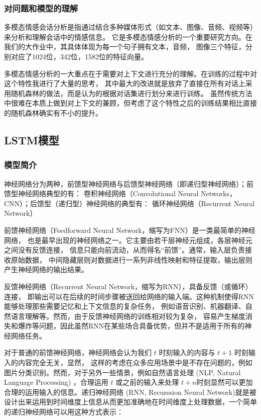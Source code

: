 \documentclass[11pt]{article}
\begin{document}
            \subsubsection{对问题和模型的理解}
            多模态情感会话分析是指通过结合多种媒体形式（如文本、图像、音频、视频等）来分析和理解会话中的情感信息。
            它是多模态情感分析的一个重要研究方向。在我们的大作业中，其具体体现为每一个句子拥有文本，音频，
            图像三个特征，分别对应了1024位，342位，1582位的特征向量。

            多模态情感分析的一大重点在于需要对上下文进行充分的理解。在训练的过程中对这个特性我进行了大量的思考，
            其中最大的改进就是放弃了直接在所有对话上采用随机森林的做法，而是认为的根据对话集进行划分来进行训练。
            虽然传统方法中很难在本质上做到对上下文的兼顾，但考虑了这个特性之后的训练结果相比直接的随机森林确实有不小的提升。

        \subsection{LSTM模型}
            \subsubsection{模型简介}
            神经网络分为两种，前馈型神经网络与后馈型神经网络（即递归型神经网络）；前馈型神经网络典型的有：
            卷积神经网络（Convolutional Neural Networks，CNN）；后馈型（递归型）神经网络的典型有：
            循环神经网络（Recurrent Neural Network）
            
            前馈神经网络（Feedforward Neural Network，缩写为FNN）是一类最简单的神经网络，
            也是最早出现的神经网络之一。它主要由若干层神经元组成，各层神经元之间没有反馈连接，
            信息只能向前流动，从而得名“前馈”。通常，输入层负责接收原始数据，
            中间隐藏层则对数据进行一系列非线性映射和特征提取，输出层则产生神经网络的输出结果。
            
            反馈神经网络（Recurrent Neural Network，缩写为RNN），具备反馈（或循环）连接，
            即输出可以在后续的时间步骤被送回给网络的输入端。这种机制使得RNN能够处理那些需要记忆和上下文信息的复杂任务，
            例如语音识别、机器翻译、自然语言理解等。然而，由于反馈神经网络的训练相对较为复杂，
            容易产生梯度消失和爆炸等问题，因此虽然RNN在某些场合具备优势，但并不是适用于所有的神经网络任务。
            
            对于普通的前馈神经网络，神经网络会认为我们 $t$ 时刻输入的内容与 $t+1$ 时刻输入的内容完全无关，显然，
            这样的考虑在众多应用场景中是不存在问题的，例如图片分类识别。然而，对于另外一些情景，例如自然语言处理 
            (NLP, Natural Language Processing) ，合理运用 $t$ 或之前的输入来处理 $t+n$时刻显然可以更加合理的运用输入的信息。递归神经网络 (RNN, Recurssion Neural Network)就是被设计出来运用到时间维度上信息从而更加准确地在时间维度上处理数据，一个简单的递归神经网络可以用这种方式表示：
            
\end{document}
